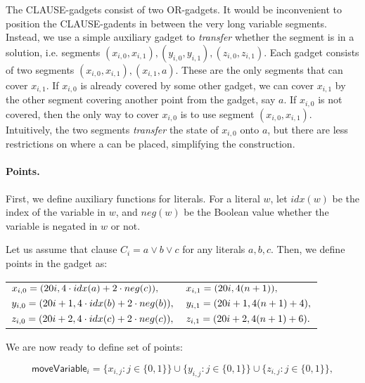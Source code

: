 The CLAUSE-gadgets consist of two OR-gadgets.
It would be inconvenient to position the CLAUSE-gadents
in between the very long variable segments.
Instead, we use a simple auxiliary gadget to
\textit{transfer} whether the segment
is in a solution, i.e. segments
$(x_{i, 0}, x_{i, 1}), (y_{i, 0}, y_{i, 1}), (z_{i, 0}, z_{i, 1})$.
Each gadget consists of two segments $(x_{i, 0}, x_{i, 1}), (x_{i, 1}, a)$.
These are the only segments that can cover $x_{i,1}$.
If $x_{i,0}$ is already covered by some other gadget,
we can cover $x_{i,1}$ by the other segment covering another point
from the gadget, say $a$.
If $x_{i,0}$ is not covered, then the only way to cover $x_{i,0}$
is to use segment $(x_{i, 0}, x_{i, 1})$.
Intuitively, the two segments \textit{transfer} the state of $x_{i,0}$
onto $a$, but there are less restrictions on where a can be placed,
simplifying the construction.

\paragraph{Points.}

\newcommand{\pointsClause}{\mathsf{pointsClause}}


First, we define auxiliary functions for literals. 
For a literal $w$, let $idx(w)$ be the index of the variable in $w$,
and $neg(w)$ be the Boolean value whether the variable is negated in $w$
or not.

Let us assume that clause $C_i = a \lor b \lor c$
for any literals $a,b,c$. Then, we define points in the gadget as:

\begin{center}
\begin{tabular}{ l l }
	$x_{i, 0} = (20 i, 4\cdot idx(a) + 2\cdot neg(c)),$ &
	$x_{i, 1} = (20 i, 4(n+1)),$ \\
	$y_{i, 0} = (20 i+1, 4\cdot idx(b) + 2\cdot neg(b)),$ &
	$y_{i, 1} = (20 i+1, 4(n+1) + 4),$ \\
	$z_{i, 0} = (20 i+2, 4\cdot idx(c) + 2\cdot neg(c)),$ &
	$z_{i, 1} = (20 i+2, 4(n+1) + 6).$
\end{tabular}
\end{center}

\newcommand{\segmentsClause}{\mathsf{segmentsClause}}	
 
We are now ready to define set of points:
 
 $$\mathsf{moveVariable}_i = 
 \{x_{i, j} : j \in \{0, 1\}\} \cup
 \{y_{i, j} : j \in \{0, 1\}\} \cup
 \{z_{i, j} : j \in \{0, 1\}\},
 $$
 
